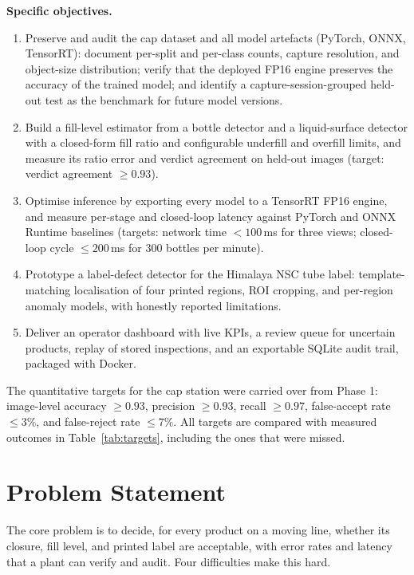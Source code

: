 \noindent\textbf{Specific objectives.}
\begin{enumerate}
    \item[\textbf{O1.}] Preserve and audit the cap dataset and all model artefacts (PyTorch, ONNX, TensorRT): document per-split and per-class counts, capture resolution, and object-size distribution; verify that the deployed FP16 engine preserves the accuracy of the trained model; and identify a capture-session-grouped held-out test as the benchmark for future model versions.
    \item[\textbf{O2.}] Build a fill-level estimator from a bottle detector and a liquid-surface detector with a closed-form fill ratio and configurable underfill and overfill limits, and measure its ratio error and verdict agreement on held-out images (target: verdict agreement $\geq 0.93$).
    \item[\textbf{O3.}] Optimise inference by exporting every model to a TensorRT FP16 engine, and measure per-stage and closed-loop latency against PyTorch and ONNX Runtime baselines (targets: network time $<100$\,ms for three views; closed-loop cycle $\leq 200$\,ms for 300 bottles per minute).
    \item[\textbf{O4.}] Prototype a label-defect detector for the Himalaya NSC tube label: template-matching localisation of four printed regions, ROI cropping, and per-region anomaly models, with honestly reported limitations.
    \item[\textbf{O5.}] Deliver an operator dashboard with live KPIs, a review queue for uncertain products, replay of stored inspections, and an exportable SQLite audit trail, packaged with Docker.
\end{enumerate}

The quantitative targets for the cap station were carried over from Phase 1: image-level accuracy $\geq 0.93$, precision $\geq 0.93$, recall $\geq 0.97$, false-accept rate $\leq 3\%$, and false-reject rate $\leq 7\%$. All targets are compared with measured outcomes in Table~\ref{tab:targets}, including the ones that were missed.

\section{Problem Statement}
\label{sec:problem-statement}

The core problem is to decide, for every product on a moving line, whether its closure, fill level, and printed label are acceptable, with error rates and latency that a plant can verify and audit. Four difficulties make this hard.


